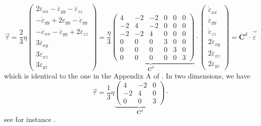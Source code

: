 \begin{equation}
\vec \tau  
= \frac{2}{3} \eta
\left(
\begin{array}{c}
2\dot\varepsilon_{xx} -\dot\varepsilon_{yy} -\dot\varepsilon_{zz} \\ 
-\dot\varepsilon_{yy} +2\dot\varepsilon_{yy} -\dot\varepsilon_{yy} \\ 
-\dot\varepsilon_{xx} -\dot\varepsilon_{yy} +2\dot\varepsilon_{zz} \\
3\dot\varepsilon_{xy} \\
3\dot\varepsilon_{xz} \\
3\dot\varepsilon_{yz} 
\end{array}
\right)
=
\underbrace{
\frac{\eta}{3}
\left(
\begin{array}{cccccc}
4 & -2& -2& 0& 0& 0\\
-2 & 4& -2& 0& 0& 0\\
-2 & -2& 4& 0& 0& 0\\
0 &0 &0 & 3& 0& 0\\
0 &0 &0 & 0& 3& 0\\
0 &0 &0 & 0& 0& 3 
\end{array}
\right)
}_{{\bm C}^d}
\cdot
\left(
\begin{array}{c}
\dot\varepsilon_{xx} \\
\dot\varepsilon_{yy} \\
\dot\varepsilon_{zz} \\
2\dot\varepsilon_{xy} \\
2\dot\varepsilon_{xz} \\
2\dot\varepsilon_{yz} 
\end{array}
\right)
=
{\bm C}^d \cdot \vec{\dot \varepsilon}
\end{equation}
which is identical to the one in the Appendix A of \cite{schm08}.
In two dimensions, we have
\[
\vec\tau=\frac{1}{3}\eta 
\underbrace{
\left(
\begin{array}{ccc}
4 & -2 & 0 \\
-2 & 4 & 0 \\
0 &0 &  3 
\end{array}
\right)
}_{{\bm C}^d}
\cdot
\]
see for instance \cite{anmp15}.

